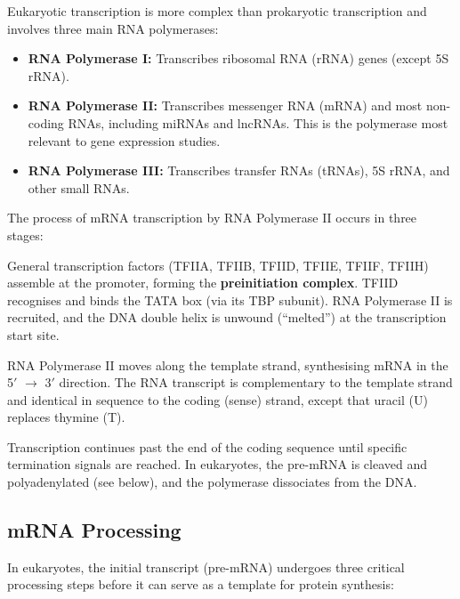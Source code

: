 Eukaryotic transcription is more complex than prokaryotic transcription and involves three main RNA polymerases:

\begin{itemize}[itemsep=2pt]
  \item \textbf{RNA Polymerase I:} Transcribes ribosomal RNA (rRNA) genes (except 5S rRNA).
  \item \textbf{RNA Polymerase II:} Transcribes messenger RNA (mRNA) and most non-coding RNAs, including miRNAs and lncRNAs. This is the polymerase most relevant to gene expression studies.
  \item \textbf{RNA Polymerase III:} Transcribes transfer RNAs (tRNAs), 5S rRNA, and other small RNAs.
\end{itemize}

The process of mRNA transcription by RNA Polymerase II occurs in three stages:

\begin{description}[style=nextline, itemsep=3pt]
  \item[Initiation] General transcription factors (TFIIA, TFIIB, TFIID, TFIIE, TFIIF, TFIIH) assemble at the promoter, forming the \textbf{preinitiation complex}. TFIID recognises and binds the TATA box (via its TBP subunit). RNA Polymerase II is recruited, and the DNA double helix is unwound (``melted'') at the transcription start site.

  \item[Elongation] RNA Polymerase II moves along the template strand, synthesising mRNA in the 5$'${} $\rightarrow$ 3$'${} direction. The RNA transcript is complementary to the template strand and identical in sequence to the coding (sense) strand, except that uracil (U) replaces thymine (T).

  \item[Termination] Transcription continues past the end of the coding sequence until specific termination signals are reached. In eukaryotes, the pre-mRNA is cleaved and polyadenylated (see below), and the polymerase dissociates from the DNA.
\end{description}

\subsection{mRNA Processing}
\label{subsec:molbio:mrna-processing}

In eukaryotes, the initial transcript (pre-mRNA) undergoes three critical processing steps before it can serve as a template for protein synthesis:


